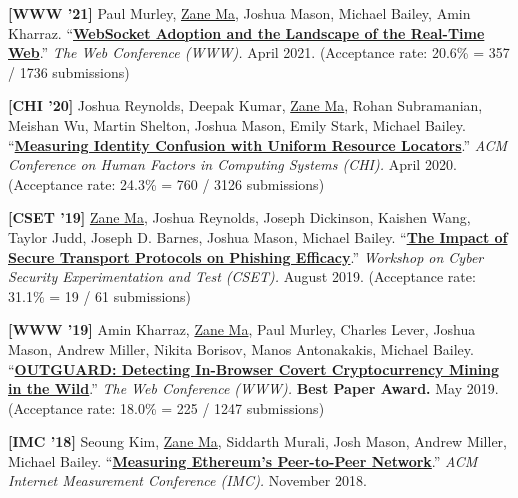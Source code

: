 \documentclass[10pt,singlecolumn]{article} %
\begin{document}
\begin{etaremune}
\item \textbf{[WWW '21]}
Paul Murley, \underline{Zane Ma}, Joshua Mason, Michael Bailey, Amin Kharraz.
``\textbf{\href{https://zanema.com/papers/www21_websockets.pdf}{WebSocket Adoption and the Landscape of the Real-Time Web}}.''
\emph{The Web Conference (WWW).} April 2021.
(Acceptance rate: 20.6\% = 357 / 1736 submissions)
\vspace{6pt}


\item \textbf{[CHI '20]}
Joshua Reynolds, Deepak Kumar, \underline{Zane Ma}, Rohan Subramanian, Meishan Wu, Martin Shelton, Joshua Mason, Emily Stark, Michael Bailey.
``\textbf{\href{https://zanema.com/papers/chi20_urlconfusion.pdf}{Measuring Identity Confusion with Uniform Resource Locators}}.''
\emph{ACM Conference on Human Factors in Computing Systems (CHI).} April 2020.
(Acceptance rate: 24.3\% = 760 / 3126 submissions)
\vspace{6pt}


\item \textbf{[CSET '19]}
\underline{Zane Ma}, Joshua Reynolds, Joseph Dickinson, Kaishen Wang, Taylor Judd, Joseph D. Barnes, Joshua Mason, Michael Bailey.
``\textbf{\href{https://zanema.com/papers/cset19_httpsphishing.pdf}{The Impact of Secure Transport Protocols on Phishing Efficacy}}.''
\emph{Workshop on Cyber Security Experimentation and Test (CSET).} August 2019.
(Acceptance rate: 31.1\% = 19 / 61 submissions)
\vspace{6pt}


\item  \textbf{[WWW '19]}
Amin Kharraz, \underline{Zane Ma}, Paul Murley, Charles Lever, Joshua Mason, Andrew Miller, Nikita Borisov, Manos Antonakakis, Michael Bailey. 
``\textbf{\href{https://zanema.com/papers/www19_cryptojacking.pdf}{OUTGUARD: Detecting In-Browser Covert Cryptocurrency Mining in the Wild}}.''
\emph{The Web Conference (WWW).} \textbf{\color{headings}Best Paper Award.} May 2019.
(Acceptance rate: 18.0\% = 225 / 1247 submissions)
\vspace{6pt}


\item \textbf{[IMC '18]}
Seoung Kim, \underline{Zane Ma}, Siddarth Murali, Josh Mason, Andrew Miller, Michael Bailey.
``\textbf{\href{https://zanema.com/papers/imc18_ethpeers.pdf}{Measuring Ethereum's Peer-to-Peer Network}}.''
\emph{ACM Internet Measurement Conference (IMC).} November 2018.


\end{etaremune}
\end{document}
